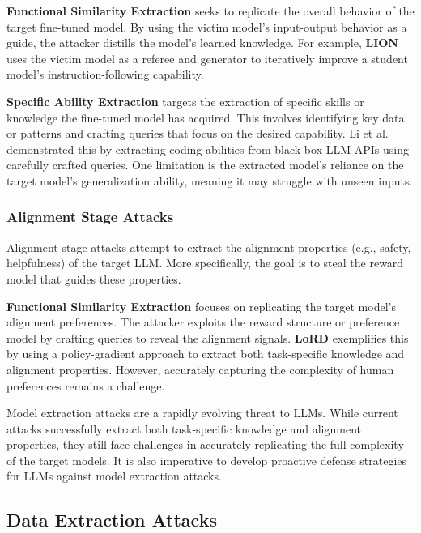 \textbf{Functional Similarity Extraction} seeks to replicate the overall behavior of the target fine-tuned model. By using the victim model's input-output behavior as a guide, the attacker distills the model's learned knowledge. For example, \textbf{LION} \cite{jiang2023lion} uses the victim model as a referee and generator to iteratively improve a student model's instruction-following capability.

\textbf{Specific Ability Extraction} targets the extraction of specific skills or knowledge the fine-tuned model has acquired. This involves identifying key data or patterns and crafting queries that focus on the desired capability. Li et al. \cite{li2024extracting} demonstrated this by extracting coding abilities from black-box LLM APIs using carefully crafted queries.
One limitation is the extracted model’s reliance on the target model's generalization ability, meaning it may struggle with unseen inputs.


\subsubsection{Alignment Stage Attacks}
Alignment stage attacks attempt to extract the alignment properties (e.g., safety, helpfulness) of the target LLM. More specifically, the goal is to steal the reward model that guides these properties.

\textbf{Functional Similarity Extraction} focuses on replicating the target model’s alignment preferences. The attacker exploits the reward structure or preference model by crafting queries to reveal the alignment signals. \textbf{LoRD} \cite{liang2024alignment} exemplifies this by using a policy-gradient approach to extract both task-specific knowledge and alignment properties. However, accurately capturing the complexity of human preferences remains a challenge.

Model extraction attacks are a rapidly evolving threat to LLMs. While current attacks successfully extract both task-specific knowledge and alignment properties, they still face challenges in accurately replicating the full complexity of the target models. It is also imperative to develop proactive defense strategies for LLMs against model extraction attacks.


\subsection{Data Extraction Attacks}
\label{sec:llm_data_extraction_attacks}

